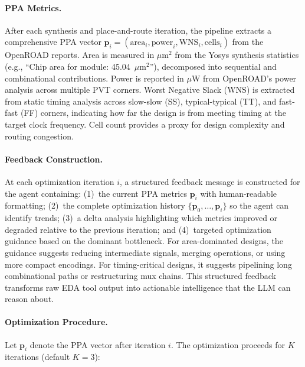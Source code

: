 \paragraph{PPA Metrics.}
After each synthesis and place-and-route iteration, the pipeline extracts a comprehensive PPA vector $\mathbf{p}_i = (\text{area}_i, \text{power}_i, \text{WNS}_i, \text{cells}_i)$ from the OpenROAD reports. Area is measured in $\mu\text{m}^2$ from the Yosys synthesis statistics (e.g., ``Chip area for module: 45.04~$\mu\text{m}^2$''), decomposed into sequential and combinational contributions. Power is reported in $\mu\text{W}$ from OpenROAD's power analysis across multiple PVT corners. Worst Negative Slack (WNS) is extracted from static timing analysis across slow-slow (SS), typical-typical (TT), and fast-fast (FF) corners, indicating how far the design is from meeting timing at the target clock frequency. Cell count provides a proxy for design complexity and routing congestion.

\paragraph{Feedback Construction.}
At each optimization iteration $i$, a structured feedback message is constructed for the agent containing: (1)~the current PPA metrics $\mathbf{p}_i$ with human-readable formatting; (2)~the complete optimization history $\{\mathbf{p}_0, \ldots, \mathbf{p}_i\}$ so the agent can identify trends; (3)~a delta analysis highlighting which metrics improved or degraded relative to the previous iteration; and (4)~targeted optimization guidance based on the dominant bottleneck. For area-dominated designs, the guidance suggests reducing intermediate signals, merging operations, or using more compact encodings. For timing-critical designs, it suggests pipelining long combinational paths or restructuring mux chains. This structured feedback transforms raw EDA tool output into actionable intelligence that the LLM can reason about.

\paragraph{Optimization Procedure.}
Let $\mathbf{p}_i$ denote the PPA vector after iteration $i$. The optimization proceeds for $K$ iterations (default $K{=}3$):

